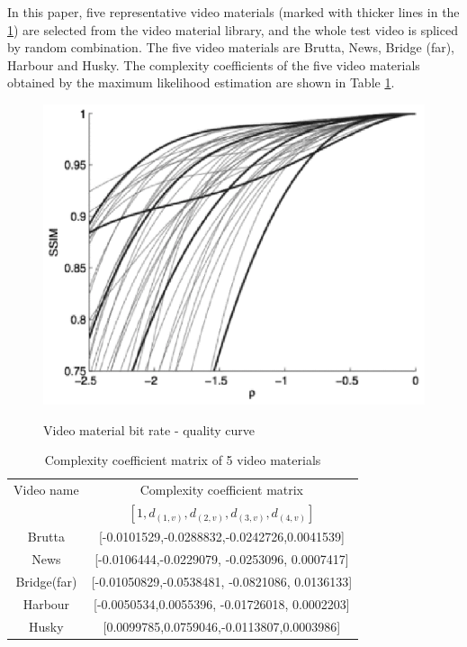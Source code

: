 \documentclass[twocolumn]{article}
\renewcommand\arraystretch{1.2}
\begin{document}
In this paper, five representative video materials (marked with thicker lines in 
the \ref{Video material bit rate-quality curve}) are selected from the video material library,
 and the whole test video is spliced by random combination. The five video materials are Brutta, 
 News, Bridge (far), Harbour and Husky. The complexity coefficients of the five video 
 materials obtained by the maximum likelihood estimation are shown in Table \ref{complexity coefficient matrix}.
\begin{figure}[htb]
\centering
\includegraphics[width=0.8\columnwidth]{complexity}
\caption{Video material bit rate - quality curve}
\cite{RN19}
\label{Video material bit rate-quality curve}
\end{figure}
\begin{table}[htbp]
\renewcommand\arraystretch{0.8}
\centering
\caption{Complexity coefficient matrix of 5 video materials}
\label{complexity coefficient matrix}
\begin{tabular}{cc}
\toprule 
Video name&Complexity coefficient matrix\\
&$\left[1,d_{(1,v)},d_{(2,v)},d_{(3,v)},d_{(4,v)}\right]$\\
\midrule
Brutta&[-0.0101529,-0.0288832,-0.0242726,0.0041539]\\
News&[-0.0106444,-0.0229079, -0.0253096, 0.0007417]\\
Bridge(far)&[-0.01050829,-0.0538481, -0.0821086, 0.0136133]\\
Harbour&[-0.0050534,0.0055396, -0.01726018, 0.0002203]\\
Husky&[0.0099785,0.0759046,-0.0113807,0.0003986]\\
\bottomrule 
\end{tabular}
\end{table}
\end{document}
